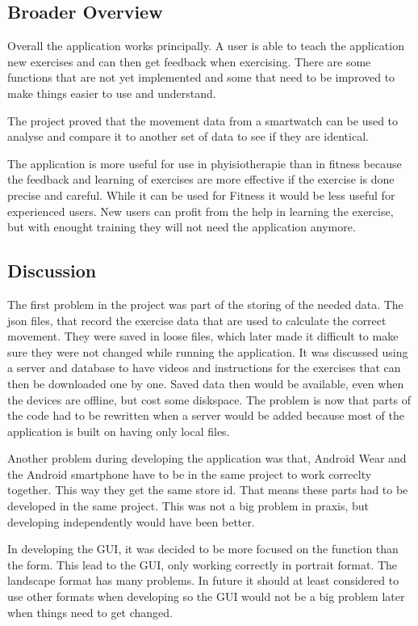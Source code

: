 \subsection{Broader Overview}
Overall the application works principally. A user is able to teach the application new exercises and can then get feedback when exercising. There are some functions that are not yet implemented and some that need to be improved to make things easier to use and understand.

The project proved that the movement data from a smartwatch can be used to analyse and compare it to another set of data to see if they are identical.

The application is more useful for use in phyisiotherapie than in fitness because the feedback and learning of exercises are more effective if the exercise is done precise and careful. While it can be used for Fitness it would be less useful for experienced users. New users can profit from the help in learning the exercise, but with enought training they will not need the application anymore.

\subsection{Discussion}
The first problem in the project was part of the storing of the needed data. The json files, that record the exercise data that are used to calculate the correct movement. They were saved in loose files, which later made it difficult to make sure they were not changed while running the application. It was discussed using a server and database to have videos and instructions for the exercises that can then be downloaded one by one. Saved data then would be available, even when the devices are offline, but cost some diskspace. The problem is now that parts of the code had to be rewritten when a server would be added because most of the application is built on having only local files.

Another problem during developing the application was that, Android Wear and the Android smartphone have to be in the same project to work correclty together. This way they get the same store id. That means these parts had to be developed in the same project. This was not a big problem in praxis, but developing independently would have been better.

In developing the GUI, it was decided to be more focused on the function than the form. This lead to the GUI, only working correctly in portrait format. The landscape format has many problems. In future it should at least considered to use other formats when developing so the GUI would not be a big problem later when things need to get changed.


